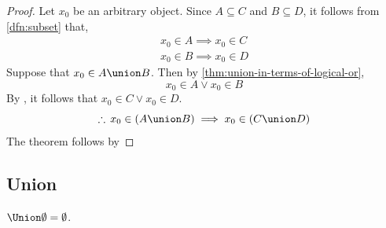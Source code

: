 \begin{proof}
    Let \( x_{0} \) be an arbitrary object. Since \( A \subseteq C \) and \( B \subseteq D \), it follows from \cref{dfn:subset}
    that,
    \begin{gather*}
        x_{0} \in A \implies x_{0} \in C \\
        x_{0} \in B \implies x_{0} \in D
    \end{gather*}
    Suppose that \( x_{0} \in A \union B \). Then by \cref{thm:union-in-terms-of-logical-or},
    \begin{equation*}
        x_{0} \in A \lor x_{0} \in B
    \end{equation*}
    By , it follows that \( x_{0} \in C \lor x_{0} \in D \).
    \begin{equation*}
        \therefore \, x_{0} \in \mleft( A \union B \mright) \implies x_{0} \in \mleft( C \union D \mright)
    \end{equation*}
    The theorem follows by 
\end{proof}

\subsection{Union}
\begin{thm}
    \label{set-identities:union-of-empty-set-is-empty}
    \( \Union \emptyset = \emptyset \).
\end{thm}

